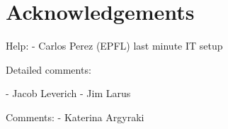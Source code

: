
\section*{Acknowledgements}

Help:
 - Carlos Perez (EPFL) last minute IT setup

Detailed comments:

 - Jacob Leverich
 - Jim Larus

Comments:
 - Katerina Argyraki

